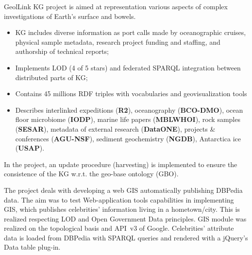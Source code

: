 \documentclass[
]{ceurart}
\begin{document}
  GeolLink KG project \cite{geolink} is aimed at representation various aspects of complex investigations of Earth's surface and bowels.
  \begin{itemize}
  \item KG includes diverse information as port calls made by oceanographic cruises, physical sample metadata, research project funding and staffing, and authorship of technical reports;
  \item Implements LOD (4 of 5 stars) and federated SPARQL integration between distributed parts of KG;
  \item Contains 45 millions RDF triples with vocabularies and geovisualization tools
  \item Describes interlinked expeditions (\textbf{R2}), oceanography (\textbf{BCO-DMO}), ocean floor microbiome (\textbf{IODP}), marine life papers (\textbf{MBLWHOI}), rock samples (\textbf{SESAR}), metadata of external research (\textbf{DataONE}),  projects \& conferences (\textbf{AGU-NSF}), sediment geochemistry (\textbf{NGDB}), Antarctica ice (\textbf{USAP}).
  \end{itemize}
  In the project, an update procedure (harvesting) is implemented to ensure the consistence of the KG w.r.t. the geo-base ontology (GBO).

   The project \cite{abid} deals with developing a web GIS automatically publishing DBPedia data.  The aim was to test Web-application tools capabilities in implementing GIS, which publishes celebrities' information living in a hometown/city. This is realized respecting LOD and Open Government Data principles.   GIS module was realized on the topological basis and API~v3 of Google. Celebrities' attribute data is loaded from DBPedia with SPARQL queries and rendered with a jQuery's Data table plug-in.
\end{document}
